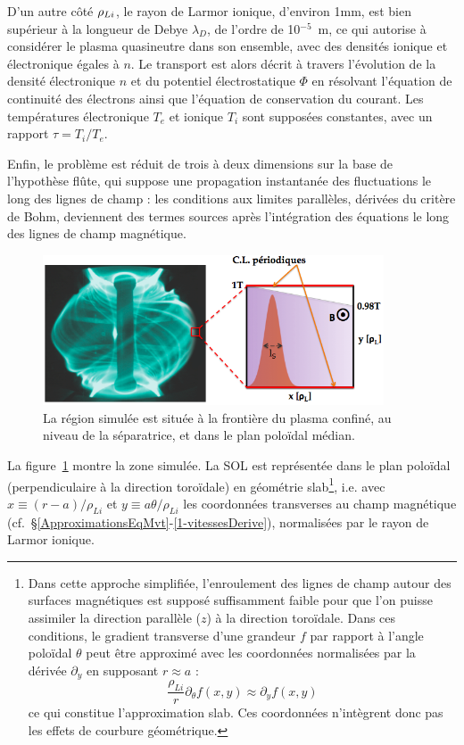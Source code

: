 \begin{refsection}
D'un autre côté $\rho{_{Li}}$, le rayon de Larmor ionique, d'environ
1mm, est bien supérieur à la longueur de
Debye $\lambda_D$, de l'ordre de 10$^{-5}$~m, ce qui autorise à
considérer le plasma quasineutre dans son ensemble, avec des densités ionique
et électronique égales à $n$.
Le transport est alors décrit à travers l'évolution de la densité
électronique $n$ et du potentiel électrostatique $\Phi$ en résolvant l'équation
de continuité des électrons ainsi que l'équation de conservation du courant. Les
températures électronique
$T_e$ et ionique $T_i$ sont supposées constantes, avec un rapport $\tau=T_i/T_e$.

Enfin, le problème est réduit de trois à deux dimensions sur la base de l'hypothèse
flûte, qui suppose une propagation instantanée des fluctuations le long des
lignes de champ : les conditions aux limites parallèles, dérivées du critère de
Bohm, deviennent des termes sources après l'intégration des équations le long
des lignes de champ magnétique.

\begin{figure}[!htbp]
\centering
    \includegraphics[width=0.9\textwidth]{figures/2-tokamSimDomain.png}
    \caption{La région simulée est située à la frontière du plasma confiné,
    au niveau de la séparatrice, et dans le plan poloïdal médian.}
    \label{2-figTokamGeom}
\end{figure}

La figure~\ref{2-figTokamGeom} montre la zone simulée. La SOL est représentée dans le plan
poloïdal (perpendiculaire à la direction toroïdale)
en géométrie slab\footnote{Dans cette approche simplifiée, l'enroulement des
lignes de champ autour des surfaces magnétiques est supposé suffisamment
faible pour que l'on puisse assimiler la direction parallèle ($z$) à la
direction toroïdale. Dans ces conditions, le gradient transverse d'une
grandeur $f$ par rapport à l'angle poloïdal $\theta$ peut être approximé avec
les coordonnées normalisées par la dérivée $\partial_y$ en supposant $r\approx
a$ :
$$\frac{\rho_{Li}}{r}\partial_\theta f(x,y)\approx\partial_y
f(x,y)$$
ce qui constitue l'approximation slab. Ces
coordonnées n'intègrent donc pas les effets de courbure géométrique.}, i.e.
avec $x\equiv(r-a)/\rho_{Li}$ et $y\equiv a\theta/\rho_{Li}$ les coordonnées
transverses au champ magnétique
(cf.~\S\ref{ApproximationsEqMvt}-\ref{1-vitessesDerive}), normalisées par le rayon de Larmor ionique.


\end{refsection}
